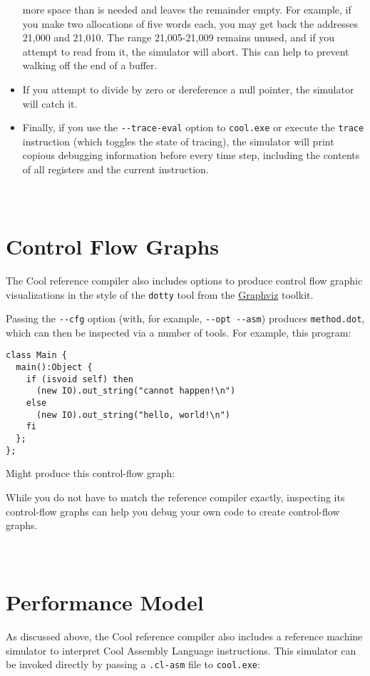 \documentclass[]{article}
\begin{document}
\begin{itemize}
  more space than is needed and leaves the remainder empty. For example,
  if you make two allocations of five words each, you may get back the
  addresses 21,000 and 21,010. The range 21,005-21,009 remains unused,
  and if you attempt to read from it, the simulator will abort. This can
  help to prevent walking off the end of a buffer.
\item
  If you attempt to divide by zero or dereference a null pointer, the
  simulator will catch it.
\item
  Finally, if you use the \texttt{-{}-trace-eval} option to
  \texttt{cool.exe} or execute the \texttt{trace} instruction (which
  toggles the state of tracing), the simulator will print copious
  debugging information before every time step, including the contents
  of all registers and the current instruction.
\end{itemize}

\section{\\ Control Flow Graphs}

The Cool reference compiler also includes options to produce control
flow graphic visualizations in the style of the \texttt{dotty} tool from
the \href{http://en.wikipedia.org/wiki/Graphviz}{Graphviz} toolkit.

Passing the \texttt{-{}-cfg} option (with, for example,
\texttt{-{}-opt -{}-asm}) produces \texttt{method.dot}, which can then
be inspected via a number of tools. For example, this program:

\begin{verbatim}
class Main {
  main():Object {
    if (isvoid self) then  
      (new IO).out_string("cannot happen!\n")
    else 
      (new IO).out_string("hello, world!\n")
    fi 
  };
};
\end{verbatim}

Might produce this control-flow graph:

While you do not have to match the reference compiler exactly,
inspecting its control-flow graphs can help you debug your own code to
create control-flow graphs.

\section{\\ Performance Model}

As discussed above, the Cool reference compiler also includes a
reference machine simulator to interpret Cool Assembly Language
instructions. This simulator can be invoked directly by passing a
\texttt{.cl-asm} file to \texttt{cool.exe}:
\end{document}
